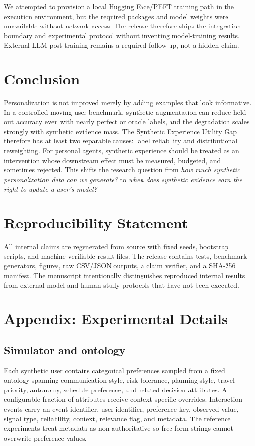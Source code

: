 \documentclass[10pt,twocolumn]{article}
\begin{document}
We attempted to provision a local Hugging Face/PEFT training path in the execution environment, but the required packages and model weights were unavailable without network access. The release therefore ships the integration boundary and experimental protocol without inventing model-training results. External LLM post-training remains a required follow-up, not a hidden claim.

\section{Conclusion}
Personalization is not improved merely by adding examples that look informative. In a controlled moving-user benchmark, synthetic augmentation can reduce held-out accuracy even with nearly perfect or oracle labels, and the degradation scales strongly with synthetic evidence mass. The Synthetic Experience Utility Gap therefore has at least two separable causes: label reliability and distributional reweighting. For personal agents, synthetic experience should be treated as an intervention whose downstream effect must be measured, budgeted, and sometimes rejected. This shifts the research question from \emph{how much synthetic personalization data can we generate?} to \emph{when does synthetic evidence earn the right to update a user's model?}

\section*{Reproducibility Statement}
All internal claims are regenerated from source with fixed seeds, bootstrap scripts, and machine-verifiable result files. The release contains tests, benchmark generators, figures, raw CSV/JSON outputs, a claim verifier, and a SHA-256 manifest. The manuscript intentionally distinguishes reproduced internal results from external-model and human-study protocols that have not been executed.


\appendix
\section{Appendix: Experimental Details}
\subsection{Simulator and ontology}
Each synthetic user contains categorical preferences sampled from a fixed ontology spanning communication style, risk tolerance, planning style, travel priority, autonomy, schedule preference, and related decision attributes. A configurable fraction of attributes receive context-specific overrides. Interaction events carry an event identifier, user identifier, preference key, observed value, signal type, reliability, context, relevance flag, and metadata. The reference experiments treat metadata as non-authoritative so free-form strings cannot overwrite preference values.
\end{document}

